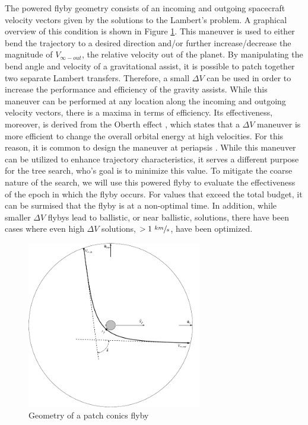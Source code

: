 \documentclass[letterpaper, preprint, paper,11pt]{AAS}	%
\begin{document}
The powered flyby geometry consists of an incoming and outgoing spacecraft velocity vectors given by the solutions to the Lambert’s problem. A graphical overview of this condition is shown in Figure \ref*{fig:flyby}. This maneuver is used to either bend the trajectory to a desired direction and/or further increase/decrease the magnitude of $V_{\infty-out}$, the relative velocity out of the planet. By manipulating the bend angle and velocity of a gravitational assist, it is possible to patch together two separate Lambert transfers. Therefore, a small $\Delta V$ can be used in order to increase the performance and efficiency of the gravity assists. While this maneuver can be performed at any location along the incoming and outgoing velocity vectors, there is a maxima in terms of efficiency. Its effectiveness, moreover, is derived from the Oberth effect \cite{Adams2010}, which states that a $\Delta V$ maneuver is more efficient to change the overall orbital energy at high velocities. For this reason, it is common to design the maneuver at periapsis \cite{Brennan2015}. While this maneuver can be utilized to enhance trajectory characteristics, it serves a different purpose for the tree search, who's goal is to minimize this value. To mitigate the coarse nature of the search, we will use this powered flyby to evaluate the effectiveness of the epoch in which the flyby occurs. For values that exceed the total budget, it can be surmised that the flyby is at a non-optimal time. In addition, while smaller $\Delta V$ flybys lead to ballistic, or near ballistic, solutions, there have been cases where even high $\Delta V$ solutions, $> 1 \text{ } \sfrac{km}{s}$, have been optimized.

\begin{figure}[hb]
    \centering
    \includegraphics[width=3in]{fig/flybyGeo.png}
    \caption{Geometry of a patch conics flyby}
    \label{fig:flyby}
\end{figure}
\end{document}
